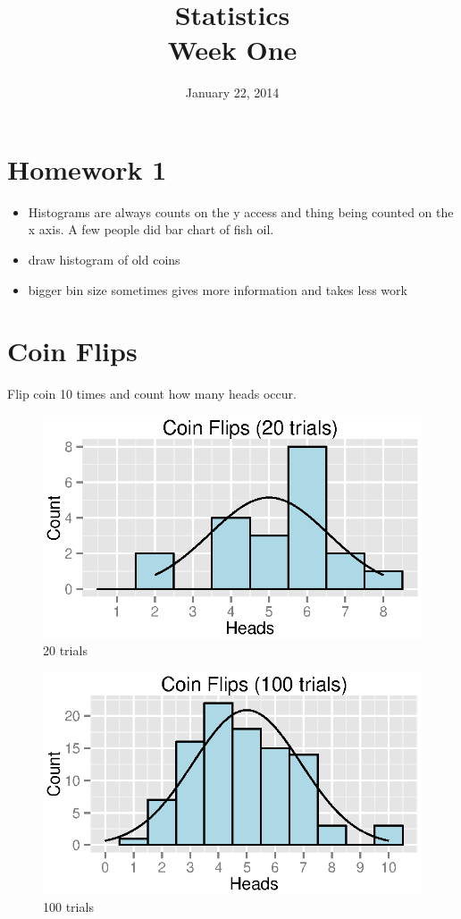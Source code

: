 \documentclass{exam}
\author{}
\date{January 22, 2014}
\title{Statistics \\ Week One}
\begin{document}
  \maketitle
  \tableofcontents
  \section{Homework 1}

  \begin{itemize}
    \item Histograms are always counts on the y access and thing being counted on the x
      axis.   A few people did bar chart of fish oil.

    \item draw histogram of old coins

    \item bigger bin size sometimes gives more information and takes less work
  \end{itemize}

  \section{Coin Flips}

  Flip coin 10 times and count how many heads occur.

  \begin{figure}[H]
    \centering
    \includegraphics{figures/coins/20_10.eps}
    \caption{20 trials}
  \end{figure}

  \begin{figure}[H]
    \centering
    \includegraphics{figures/coins/100_10.eps}
    \caption{100 trials}
  \end{figure}
\end{document}
